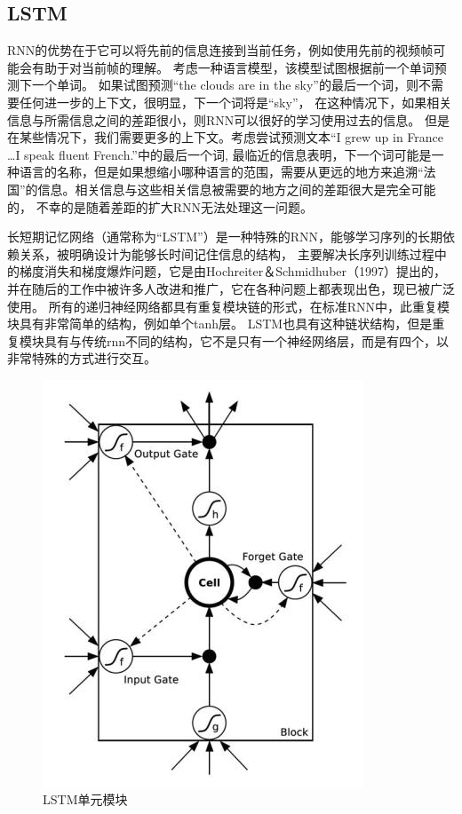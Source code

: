   
\subsection{LSTM}
  RNN的优势在于它可以将先前的信息连接到当前任务，例如使用先前的视频帧可能会有助于对当前帧的理解。
  考虑一种语言模型，该模型试图根据前一个单词预测下一个单词。
  如果试图预测“the clouds are in the sky”的最后一个词，则不需要任何进一步的上下文，很明显，下一个词将是“sky”，
  在这种情况下，如果相关信息与所需信息之间的差距很小，则RNN可以很好的学习使用过去的信息。
  但是在某些情况下，我们需要更多的上下文。考虑尝试预测文本“I grew up in France \dots I speak fluent French.”中的最后一个词,
  最临近的信息表明，下一个词可能是一种语言的名称，但是如果想缩小哪种语言的范围，需要从更远的地方来追溯“法国”的信息。相关信息与这些相关信息被需要的地方之间的差距很大是完全可能的，
不幸的是随着差距的扩大RNN无法处理这一问题。

长短期记忆网络（通常称为“LSTM”）是一种特殊的RNN\cite{hochreiter1997long}，能够学习序列的长期依赖关系，被明确设计为能够长时间记住信息的结构，
主要解决长序列训练过程中的梯度消失和梯度爆炸问题，它是由Hochreiter＆Schmidhuber（1997）提出的，
并在随后的工作中被许多人改进和推广，它在各种问题上都表现出色，现已被广泛使用。
所有的递归神经网络都具有重复模块链的形式，在标准RNN中，此重复模块具有非常简单的结构，例如单个tanh层。
LSTM也具有这种链状结构，但是重复模块具有与传统rnn不同的结构，它不是只有一个神经网络层，而是有四个，以非常特殊的方式进行交互。

\begin{figure}[htbp]
  \centering
  \includegraphics[scale=0.8]{./images/LSTM.jpg}
  \caption{LSTM单元模块\cite{sundermeyer2012lstm}}
  \label{fig:LSTM}
\end{figure}

